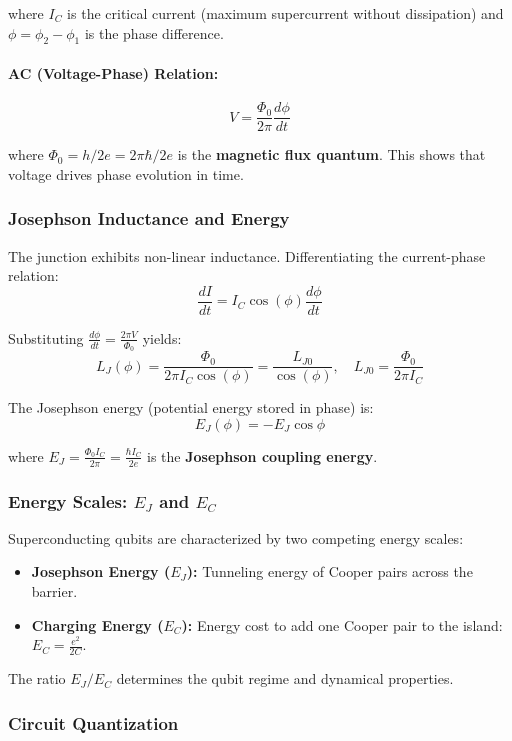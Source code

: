 \documentclass{article}
\begin{document}
where $I_C$ is the critical current (maximum supercurrent without dissipation) and $\phi = \phi_2 - \phi_1$ is the phase difference.

\paragraph{AC (Voltage-Phase) Relation:}
$$V = \frac{\Phi_0}{2\pi}\frac{d\phi}{dt}$$

where $\Phi_0 = h/2e = 2\pi\hbar/2e$ is the \textbf{magnetic flux quantum}. This shows that voltage drives phase evolution in time.

\subsubsection*{Josephson Inductance and Energy}

The junction exhibits non-linear inductance. Differentiating the current-phase relation:
$$\frac{dI}{dt} = I_C \cos(\phi) \frac{d\phi}{dt}$$

Substituting $\frac{d\phi}{dt} = \frac{2\pi V}{\Phi_0}$ yields:
$$L_J(\phi) = \frac{\Phi_0}{2\pi I_C \cos(\phi)} = \frac{L_{J0}}{\cos(\phi)}, \quad L_{J0} = \frac{\Phi_0}{2\pi I_C}$$

The Josephson energy (potential energy stored in phase) is:
$$E_J(\phi) = -E_J \cos \phi$$

where $E_J = \frac{\Phi_0 I_C}{2\pi} = \frac{\hbar I_C}{2e}$ is the \textbf{Josephson coupling energy}.

\subsubsection*{Energy Scales: $E_J$ and $E_C$}

Superconducting qubits are characterized by two competing energy scales:

\begin{itemize}
    \item \textbf{Josephson Energy ($E_J$):} Tunneling energy of Cooper pairs across the barrier.
    \item \textbf{Charging Energy ($E_C$):} Energy cost to add one Cooper pair to the island: $E_C = \frac{e^2}{2C}$.
\end{itemize}

The ratio $E_J / E_C$ determines the qubit regime and dynamical properties.

\subsubsection*{Circuit Quantization}
\end{document}
